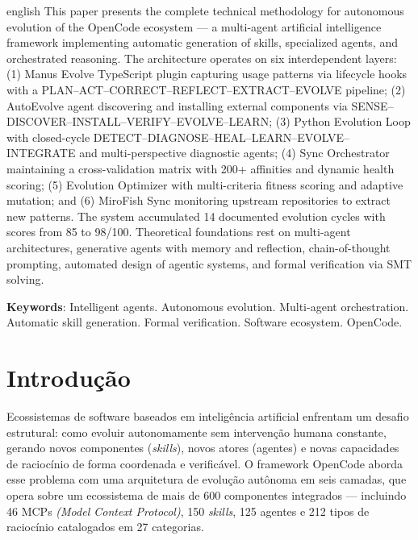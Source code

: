 \documentclass[
  article,
  12pt,
  oneside,
  a4paper,
  brazil,
  sumario=tradicional
]{abntex2}
\begin{document}
\begin{resumoumacoluna}
\begin{otherlanguage*}{english}
This paper presents the complete technical methodology for autonomous evolution of the OpenCode ecosystem --- a multi-agent artificial intelligence framework implementing automatic generation of skills, specialized agents, and orchestrated reasoning. The architecture operates on six interdependent layers: (1) Manus Evolve TypeScript plugin capturing usage patterns via lifecycle hooks with a PLAN--ACT--CORRECT--REFLECT--EXTRACT--EVOLVE pipeline; (2) AutoEvolve agent discovering and installing external components via SENSE--DISCOVER--INSTALL--VERIFY--EVOLVE--LEARN; (3) Python Evolution Loop with closed-cycle DETECT--DIAGNOSE--HEAL--LEARN--EVOLVE--INTEGRATE and multi-perspective diagnostic agents; (4) Sync Orchestrator maintaining a cross-validation matrix with 200+ affinities and dynamic health scoring; (5) Evolution Optimizer with multi-criteria fitness scoring and adaptive mutation; and (6) MiroFish Sync monitoring upstream repositories to extract new patterns. The system accumulated 14 documented evolution cycles with scores from 85 to 98/100. Theoretical foundations rest on multi-agent architectures, generative agents with memory and reflection, chain-of-thought prompting, automated design of agentic systems, and formal verification via SMT solving.

\vspace{\onelineskip}
\noindent\textbf{Keywords}: Intelligent agents. Autonomous evolution. Multi-agent orchestration. Automatic skill generation. Formal verification. Software ecosystem. OpenCode.
\end{otherlanguage*}
\end{resumoumacoluna}

\textual

\section{Introdução}

Ecossistemas de software baseados em inteligência artificial enfrentam um desafio estrutural: como evoluir autonomamente sem intervenção humana constante, gerando novos componentes (\emph{skills}), novos atores (agentes) e novas capacidades de raciocínio de forma coordenada e verificável. O framework OpenCode aborda esse problema com uma arquitetura de evolução autônoma em seis camadas, que opera sobre um ecossistema de mais de 600 componentes integrados --- incluindo 46 MCPs \emph{(Model Context Protocol)}, 150 \emph{skills}, 125 agentes e 212 tipos de raciocínio catalogados em 27 categorias.
\end{document}
